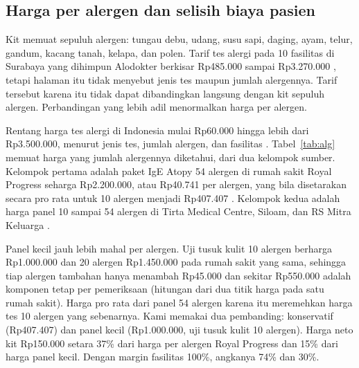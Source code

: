 \documentclass[11pt,a4paper]{article}
\begin{document}
\subsection{Harga per alergen dan selisih biaya pasien}

Kit memuat sepuluh alergen: tungau debu, udang, susu sapi, daging, ayam, telur, gandum, kacang tanah, kelapa, dan polen. Tarif tes alergi pada 10 fasilitas di Surabaya yang dihimpun Alodokter berkisar Rp485.000 sampai Rp3.270.000 \cite{alodokter}, tetapi halaman itu tidak menyebut jenis tes maupun jumlah alergennya. Tarif tersebut karena itu tidak dapat dibandingkan langsung dengan kit sepuluh alergen. Perbandingan yang lebih adil menormalkan harga per alergen.

Rentang harga tes alergi di Indonesia mulai Rp60.000 hingga lebih dari Rp3.500.000, menurut jenis tes, jumlah alergen, dan fasilitas \cite{tim}. Tabel~\ref{tab:alg} memuat harga yang jumlah alergennya diketahui, dari dua kelompok sumber. Kelompok pertama adalah paket IgE Atopy 54 alergen di rumah sakit Royal Progress seharga Rp2.200.000, atau Rp40.741 per alergen, yang bila disetarakan secara pro rata untuk 10 alergen menjadi Rp407.407 \cite{royal}. Kelompok kedua adalah harga panel 10 sampai 54 alergen di Tirta Medical Centre, Siloam, dan RS Mitra Keluarga \cite{tim}.

Panel kecil jauh lebih mahal per alergen. Uji tusuk kulit 10 alergen berharga Rp1.000.000 dan 20 alergen Rp1.450.000 pada rumah sakit yang sama, sehingga tiap alergen tambahan hanya menambah Rp45.000 dan sekitar Rp550.000 adalah komponen tetap per pemeriksaan (hitungan dari dua titik harga pada satu rumah sakit). Harga pro rata dari panel 54 alergen karena itu meremehkan harga tes 10 alergen yang sebenarnya. Kami memakai dua pembanding: konservatif (Rp407.407) dan panel kecil (Rp1.000.000, uji tusuk kulit 10 alergen). Harga neto kit Rp150.000 setara 37\% dari harga per alergen Royal Progress dan 15\% dari harga panel kecil. Dengan margin fasilitas 100\%, angkanya 74\% dan 30\%.
\end{document}
